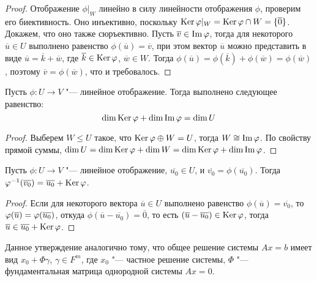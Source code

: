 \begin{proof}
	Отображение $\phi|_W$ линейно в силу линейности отображения $\phi$, проверим его биективность. Оно инъективно, поскольку $\operatorname{Ker}{\varphi|_W} = \operatorname{Ker}{\varphi} \cap W = \{\overline{0}\}$. Докажем, что оно также сюръективно. Пусть $\overline{v} \in \operatorname{Im}{\varphi}$, тогда для некоторого $\overline{u} \in U$ выполнено равенство $\phi(\overline{u}) = \overline{v}$, при этом вектор $\overline u$ можно представить в виде $\overline{u} = \overline{k} + \overline{w}$, где $\overline{k} \in \operatorname{Ker}{\varphi}$, $\overline{w} \in W$. Тогда $\phi(\overline{u}) = \phi(\overline{k}) + \phi(\overline{w}) = \phi(\overline{w})$, поэтому $\overline{v} = \phi(\overline{w})$, что и требовалось.
\end{proof}

\begin{theorem}
	Пусть $\phi: U \to V$ "--- линейное отображение. Тогда выполнено следующее равенство:
	\[\dim{\operatorname{Ker}{\ensuremath{\varphi}}} + \dim{\operatorname{Im}{\ensuremath{\varphi}}} = \dim{U}\]
\end{theorem}

\begin{proof}
	Выберем $W \le U$ такое, что $\operatorname{Ker}{\varphi} \oplus W = U$, тогда $W \cong \operatorname{Im}{\varphi}$. По свойству прямой суммы, $\dim{U} = \dim{\ke{\phi}} \hm{+} \dim{W} = \dim{\ke{\phi}} + \dim{\im{\phi}}$.
\end{proof}

\begin{proposition}
	Пусть $\phi: U \to V$ "--- линейное отображение, $\overline{u_0} \in U$, и $\overline{v_0} = \phi(\overline{u_0})$. Тогда $\varphi^{-1}(\overline{v_0}) = \overline{u_0} + \operatorname{Ker}{\varphi}$.
\end{proposition}

\begin{proof}
	Если для некоторого вектора $\overline{u} \in U$ выполнено равенство $\phi(\overline{u}) = \overline{v_0}$, то $\phi(\overline{u}) \hm{=} \phi(\overline{u_0})$, откуда $\phi(\overline{u} - \overline{u_0}) = \overline{0}$, то есть $(\overline{u} - \overline{u_0}) \in \operatorname{Ker}{\varphi}$, тогда $\overline{u} \in \overline{u_0} + \operatorname{Ker}{\varphi}$.
\end{proof}

\begin{note}
	Данное утверждение аналогично тому, что общее решение системы $Ax = b$ имеет вид $x_0 + \Phi\gamma$, $\gamma \in F^m$, где $x_0$ "--- частное решение системы, $\Phi$ "--- фундаментальная матрица однородной системы $Ax = 0$.
\end{note}

